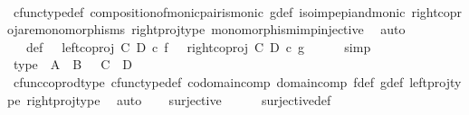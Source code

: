 \begin{isabellebody}
\ \ \ \ \isamarkupfalse%
\ cfunc{\isacharunderscore}{\kern0pt}type{\isacharunderscore}{\kern0pt}def\ composition{\isacharunderscore}{\kern0pt}of{\isacharunderscore}{\kern0pt}monic{\isacharunderscore}{\kern0pt}pair{\isacharunderscore}{\kern0pt}is{\isacharunderscore}{\kern0pt}monic\ g{\isacharunderscore}{\kern0pt}def\ iso{\isacharunderscore}{\kern0pt}imp{\isacharunderscore}{\kern0pt}epi{\isacharunderscore}{\kern0pt}and{\isacharunderscore}{\kern0pt}monic\ right{\isacharunderscore}{\kern0pt}coproj{\isacharunderscore}{\kern0pt}are{\isacharunderscore}{\kern0pt}monomorphisms\ right{\isacharunderscore}{\kern0pt}proj{\isacharunderscore}{\kern0pt}type\ monomorphism{\isacharunderscore}{\kern0pt}imp{\isacharunderscore}{\kern0pt}injective\ \isamarkupfalse%
\ auto\isanewline
\isanewline
\ \ \isamarkupfalse%
\ {\isasymphi}\ \ {\isasymphi}{\isacharunderscore}{\kern0pt}def{\isacharcolon}{\kern0pt}\ {\isachardoublequoteopen}{\isasymphi}\ {\isacharequal}{\kern0pt}\ {\isacharparenleft}{\kern0pt}left{\isacharunderscore}{\kern0pt}coproj\ C\ D\ {\isasymcirc}\isactrlsub c\ f{\isacharparenright}{\kern0pt}\ \ {\isasymamalg}\ {\isacharparenleft}{\kern0pt}right{\isacharunderscore}{\kern0pt}coproj\ C\ D\ {\isasymcirc}\isactrlsub c\ g{\isacharparenright}{\kern0pt}{\isachardoublequoteclose}\isanewline
\ \ \ \ \isamarkupfalse%
\ simp\isanewline
\ \ \isamarkupfalse%
\ \isamarkupfalse%
\ {\isasymphi}{\isacharunderscore}{\kern0pt}type{\isacharcolon}{\kern0pt}\ {\isachardoublequoteopen}{\isasymphi}{\isacharcolon}{\kern0pt}\ A\ {\isasymCoprod}\ B\ {\isasymrightarrow}\ \ C\ {\isasymCoprod}\ D{\isachardoublequoteclose}\isanewline
\ \ \ \ \isamarkupfalse%
\ cfunc{\isacharunderscore}{\kern0pt}coprod{\isacharunderscore}{\kern0pt}type\ cfunc{\isacharunderscore}{\kern0pt}type{\isacharunderscore}{\kern0pt}def\ codomain{\isacharunderscore}{\kern0pt}comp\ domain{\isacharunderscore}{\kern0pt}comp\ f{\isacharunderscore}{\kern0pt}def\ g{\isacharunderscore}{\kern0pt}def\ left{\isacharunderscore}{\kern0pt}proj{\isacharunderscore}{\kern0pt}type\ right{\isacharunderscore}{\kern0pt}proj{\isacharunderscore}{\kern0pt}type\ \isamarkupfalse%
\ auto\isanewline
\isanewline
\ \ \isamarkupfalse%
\ {\isachardoublequoteopen}surjective{\isacharparenleft}{\kern0pt}{\isasymphi}{\isacharparenright}{\kern0pt}{\isachardoublequoteclose}\isanewline
\ \ \ \ \isamarkupfalse%
\ surjective{\isacharunderscore}{\kern0pt}def\isanewline
\ \ \isamarkupfalse%

\end{isabellebody}
